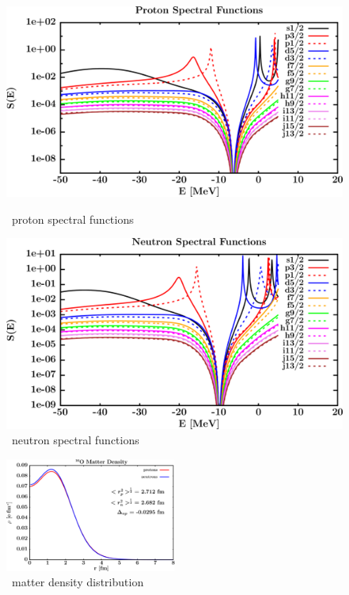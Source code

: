\begin{figure}[H]
    \centering
    \begin{minipage}{0.45\textwidth}
        \centering
        \includegraphics[width=1.0\textwidth]{figures/o16_protonSpectralFunctions.png}
        \caption{\oSix\ proton spectral functions}
        \label{DOMFitData_o16_proton_spectralFunctions}
    \end{minipage}\hfill
    \begin{minipage}{0.45\textwidth}
        \centering
        \includegraphics[width=1.0\textwidth]{figures/o16_neutronSpectralFunctions.png}
        \caption{\oSix\ neutron spectral functions}
        \label{DOMFitData_o16_neutron_spectralFunctions}
    \end{minipage}
\end{figure}

\begin{figure}[H]
    \centering
    \includegraphics[width = 0.5\textwidth]{figures/o16_matterDensity.png}
    \caption{\oSix\ matter density distribution}
    \label{DOMFitData_o16_matterDensity}
\end{figure}

